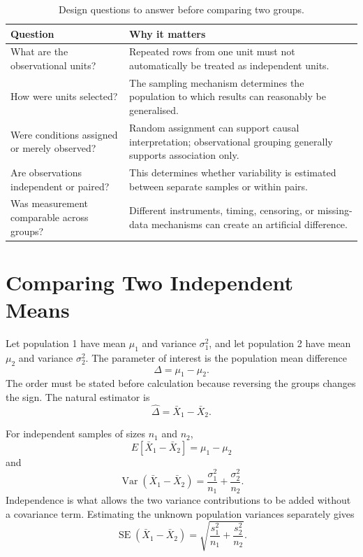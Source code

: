 \begin{table}[htbp]
\centering
\caption{Design questions to answer before comparing two groups.}
\label{tab:two-group-design-questions}
\begin{tabularx}{\textwidth}{@{}l>{\raggedright\arraybackslash}X@{}}
\toprule
Question & Why it matters \\
\midrule
What are the observational units? & Repeated rows from one unit must not automatically be treated as independent units. \\
How were units selected? & The sampling mechanism determines the population to which results can reasonably be generalised. \\
Were conditions assigned or merely observed? & Random assignment can support causal interpretation; observational grouping generally supports association only. \\
Are observations independent or paired? & This determines whether variability is estimated between separate samples or within pairs. \\
Was measurement comparable across groups? & Different instruments, timing, censoring, or missing-data mechanisms can create an artificial difference. \\
\bottomrule
\end{tabularx}
\end{table}

\FloatBarrier

\section{Comparing Two Independent Means}
\label{sec:welch-two-means}

Let population 1 have mean $\mu_1$ and variance $\sigma_1^2$, and let population 2 have mean $\mu_2$ and variance $\sigma_2^2$. The parameter of interest is the population mean difference
\[
\Delta=\mu_1-\mu_2.
\]
The order must be stated before calculation because reversing the groups changes the sign. The natural estimator is
\[
\widehat\Delta=\bar X_1-\bar X_2.
\]

For independent samples of sizes $n_1$ and $n_2$,
\[
E[\bar X_1-\bar X_2]=\mu_1-\mu_2
\]
and
\[
\operatorname{Var}(\bar X_1-\bar X_2)
=\frac{\sigma_1^2}{n_1}+\frac{\sigma_2^2}{n_2}.
\]
Independence is what allows the two variance contributions to be added without a covariance term. Estimating the unknown population variances separately gives
\[
\operatorname{SE}(\bar X_1-\bar X_2)
=
\sqrt{\frac{s_1^2}{n_1}+\frac{s_2^2}{n_2}}.
\]

